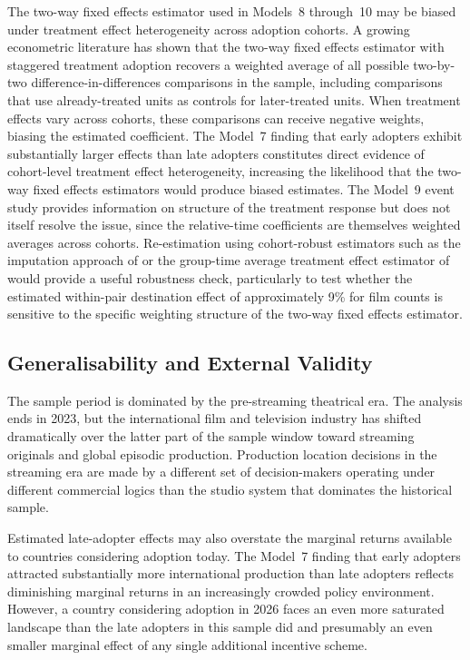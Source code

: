 The two-way fixed effects estimator used in Models~8 through~10 may be biased under treatment effect heterogeneity across adoption cohorts. A growing econometric literature \citep{goodmanbacon2021, callaway2021, dechaisemartin2020, sunabraham2021, borusyak2024} has shown that the two-way fixed effects estimator with staggered treatment adoption recovers a weighted average of all possible two-by-two difference-in-differences comparisons in the sample, including comparisons that use already-treated units as controls for later-treated units. When treatment effects vary across cohorts, these comparisons can receive negative weights, biasing the estimated coefficient. The Model~7 finding that early adopters exhibit substantially larger effects than late adopters constitutes direct evidence of cohort-level treatment effect heterogeneity, increasing the likelihood that the two-way fixed effects estimators would produce biased estimates. The Model~9 event study provides information on structure of the treatment response but does not itself resolve the issue, since the relative-time coefficients are themselves weighted averages across cohorts. Re-estimation using cohort-robust estimators such as the imputation approach of \citet{borusyak2024} or the group-time average treatment effect estimator of \citet{callaway2021} would provide a useful robustness check, particularly to test whether the estimated within-pair destination effect of approximately 9\% for film counts is sensitive to the specific weighting structure of the two-way fixed effects estimator.

\subsection{Generalisability and External Validity}
\label{sec:lim_generalisability}

The sample period is dominated by the pre-streaming theatrical era. The analysis ends in 2023, but the international film and television industry has shifted dramatically over the latter part of the sample window toward streaming originals and global episodic production. Production location decisions in the streaming era are made by a different set of decision-makers operating under different commercial logics than the studio system that dominates the historical sample. 

Estimated late-adopter effects may also overstate the marginal returns available to countries considering adoption today. The Model~7 finding that early adopters attracted substantially more international production than late adopters reflects diminishing marginal returns in an increasingly crowded policy environment. However, a country considering adoption in 2026 faces an even more saturated landscape than the late adopters in this sample did and presumably an even smaller marginal effect of any single additional incentive scheme.
